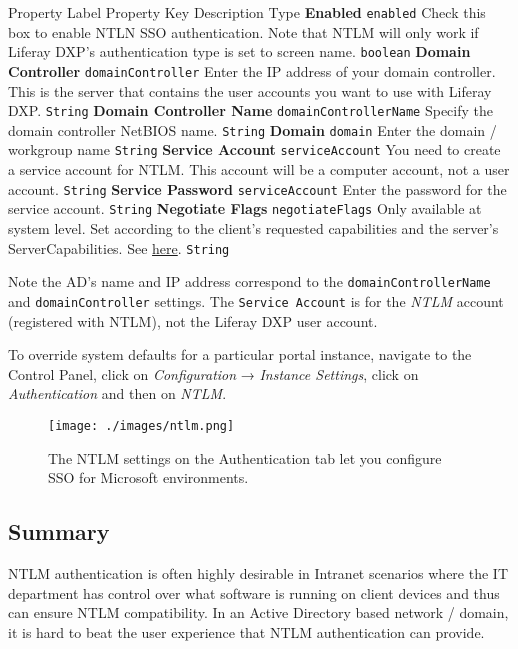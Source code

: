Property Label \textbar{} Property Key \textbar{} Description \textbar{}
Type \textbf{Enabled} \textbar{} \texttt{enabled} \textbar{} Check this
box to enable NTLN SSO authentication. Note that NTLM will only work if
Liferay DXP's authentication type is set to screen name. \textbar{}
\texttt{boolean} \textbf{Domain Controller} \textbar{}
\texttt{domainController} \textbar{} Enter the IP address of your domain
controller. This is the server that contains the user accounts you want
to use with Liferay DXP. \textbar{} \texttt{String} \textbf{Domain
Controller Name} \textbar{} \texttt{domainControllerName} \textbar{}
Specify the domain controller NetBIOS name. \textbar{} \texttt{String}
\textbf{Domain} \textbar{} \texttt{domain} \textbar{} Enter the domain /
workgroup name \textbar{} \texttt{String} \textbf{Service Account}
\textbar{} \texttt{serviceAccount} \textbar{} You need to create a
service account for NTLM. This account will be a computer account, not a
user account. \textbar{} \texttt{String} \textbf{Service Password}
\textbar{} \texttt{serviceAccount} \textbar{} Enter the password for the
service account. \textbar{} \texttt{String} \textbf{Negotiate Flags}
\textbar{} \texttt{negotiateFlags} \textbar{} Only available at system
level. Set according to the client's requested capabilities and the
server's ServerCapabilities. See
\href{http://msdn.microsoft.com/en-us/library/cc717152\%28v=PROT.10\%29.aspx}{here}.
\textbar{} \texttt{String}

Note the AD's name and IP address correspond to the
\texttt{domainControllerName} and \texttt{domainController} settings.
The \texttt{Service\ Account} is for the \emph{NTLM} account (registered
with NTLM), not the Liferay DXP user account.

To override system defaults for a particular portal instance, navigate
to the Control Panel, click on \emph{Configuration} → \emph{Instance
Settings}, click on \emph{Authentication} and then on \emph{NTLM}.

\begin{figure}
\centering
\texttt{[image: ./images/ntlm.png]}
\caption{The NTLM settings on the Authentication tab let you configure
SSO for Microsoft environments.}
\end{figure}

\subsection{Summary}\label{summary-5}

NTLM authentication is often highly desirable in Intranet scenarios
where the IT department has control over what software is running on
client devices and thus can ensure NTLM compatibility. In an Active
Directory based network / domain, it is hard to beat the user experience
that NTLM authentication can provide.

